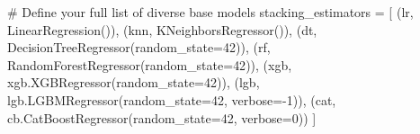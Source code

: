 \documentclass[
  letterpaper,
  DIV=11,
  numbers=noendperiod]{scrreprt}
\newenvironment{Shaded}{\begin{snugshade}}{\end{snugshade}}
\newcommand{\CommentTok}[1]{\textcolor[rgb]{0.37,0.37,0.37}{#1}}
\newcommand{\DecValTok}[1]{\textcolor[rgb]{0.68,0.00,0.00}{#1}}
\newcommand{\NormalTok}[1]{\textcolor[rgb]{0.00,0.23,0.31}{#1}}
\newcommand{\OperatorTok}[1]{\textcolor[rgb]{0.37,0.37,0.37}{#1}}
\newcommand{\StringTok}[1]{\textcolor[rgb]{0.13,0.47,0.30}{#1}}
\begin{document}
\begin{Shaded}
\begin{Highlighting}[]
\CommentTok{\# Define your full list of diverse base models}
\NormalTok{stacking\_estimators }\OperatorTok{=}\NormalTok{ [}
\NormalTok{    (}\StringTok{\textquotesingle{}lr\textquotesingle{}}\NormalTok{, LinearRegression()),}
\NormalTok{    (}\StringTok{\textquotesingle{}knn\textquotesingle{}}\NormalTok{, KNeighborsRegressor()),}
\NormalTok{    (}\StringTok{\textquotesingle{}dt\textquotesingle{}}\NormalTok{, DecisionTreeRegressor(random\_state}\OperatorTok{=}\DecValTok{42}\NormalTok{)),}
\NormalTok{    (}\StringTok{\textquotesingle{}rf\textquotesingle{}}\NormalTok{, RandomForestRegressor(random\_state}\OperatorTok{=}\DecValTok{42}\NormalTok{)),}
\NormalTok{    (}\StringTok{\textquotesingle{}xgb\textquotesingle{}}\NormalTok{, xgb.XGBRegressor(random\_state}\OperatorTok{=}\DecValTok{42}\NormalTok{)),}
\NormalTok{    (}\StringTok{\textquotesingle{}lgb\textquotesingle{}}\NormalTok{, lgb.LGBMRegressor(random\_state}\OperatorTok{=}\DecValTok{42}\NormalTok{, verbose}\OperatorTok{={-}}\DecValTok{1}\NormalTok{)),}
\NormalTok{    (}\StringTok{\textquotesingle{}cat\textquotesingle{}}\NormalTok{, cb.CatBoostRegressor(random\_state}\OperatorTok{=}\DecValTok{42}\NormalTok{, verbose}\OperatorTok{=}\DecValTok{0}\NormalTok{))}
\NormalTok{]}
\end{Highlighting}
\end{Shaded}
\end{document}
